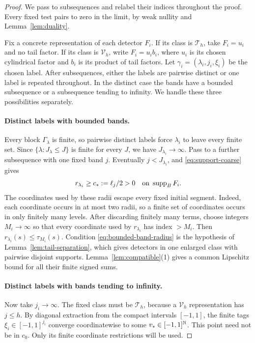 \begin{proof}
We pass to subsequences and relabel their indices throughout the proof.
Every fixed test pairs to zero in the limit, by weak nullity and
Lemma~\ref{lem:duality}.

Fix a concrete representation of each detector \(F_i\). If its class
is \(\mathcal T_h\), take \(F_i=u_i\) and no tail factor. If its class
is \(\mathcal V_h\), write \(F_i=u_i b_i\), where \(u_i\) is its
chosen cylindrical factor and \(b_i\) is its product of tail factors.
Let \(\gamma_i=(\lambda_i,j_i,\xi_i)\) be the chosen label.
After subsequences, either the labels are pairwise distinct or one
label is repeated throughout. In the distinct case the bands have a
bounded subsequence or a subsequence tending to infinity. We handle
these three possibilities separately.

\paragraph{Distinct labels with bounded bands.}
Every block \(\Gamma_\lambda\) is finite, so pairwise distinct labels
force \(\lambda_i\) to leave every finite set. Since
\(\{\lambda:J_\lambda\leq J\}\) is finite for every \(J\), we have
\(J_{\lambda_i}\to\infty\). Pass to a further subsequence with
one fixed band \(j\). Eventually \(j<J_{\lambda_i}\), and
\eqref{eq:support-coarse} gives
\begin{equation}
                  r_{\lambda_i}\geq c_*:=\ell_j/2>0
                       \quad\text{on }\operatorname{supp}_B F_i.          \label{eq:bounded-band-radius}
\end{equation}
The coordinates used by these radii escape every fixed initial
segment. Indeed, each coordinate occurs in at most two radii, so a
finite set of coordinates occurs in only finitely many levels.
After discarding finitely many terms, choose integers \(M_i\to\infty\)
so that every coordinate used by \(r_{\lambda_i}\) has index \(>M_i\).
Then \(r_{\lambda_i}(s)\leq\tau_{M_i}(s)\). Condition \eqref{eq:bounded-band-radius} is
the hypothesis of Lemma~\ref{lem:tail-separation}, which gives
detectors in one enlarged class with pairwise disjoint supports.
Lemma~\ref{lem:compatible}(1) gives a common Lipschitz bound for all
their finite signed sums.

\paragraph{Distinct labels with bands tending to infinity.}
Now take \(j_i\to\infty\). The fixed class must be \(\mathcal T_h\),
because a \(\mathcal V_h\) representation has \(j\leq h\).
By diagonal extraction from the compact intervals \([-1,1]\),
the finite tags \(\xi_i\in[-1,1]^{j_i}\) converge coordinatewise to
some \(v_*\in[-1,1]^\mathbb N\). This point need not be in \(c_0\).
Only its finite coordinate restrictions will be used.


\end{proof}
